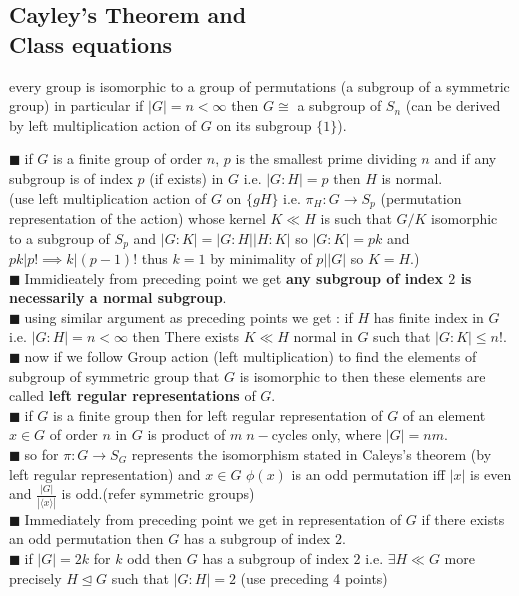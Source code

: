 \documentclass[11pt]{extarticle}
\newcommand{\ra}{\rightarrow}
\newcommand{\snote}[1]{{\footnotesize(#1)}}
\newcommand{\y}{$\blacksquare\;$}
\newcommand{\gen}[1]{\langle #1 \rangle}
\newcommand{\tbx}[2][]{
	\begin{tcolorbox}[enhanced,breakable,size=small,colback=black!2!white,title={#1},arc is angular, arc=1.5mm,drop fuzzy shadow]
		#2
	\end{tcolorbox}
}
\begin{document}
\begin{multicols}{2}
	\subsection{Cayley's Theorem and \\ Class equations}
	\tbx[\textbf{ Cayley's Theorem} ]{every group is isomorphic to a group of permutations (a subgroup
		of a symmetric group)  in particular if $ |G|=n<\infty $  then $ G\cong $ a subgroup of $ S_n $
		\snote{can be derived by left multiplication action of $ G $ on its subgroup $ \{1\} $}.
	}
	\tbx[Consequences of Cayley's theorem]{ 
			\y    if   $ G $ is a finite group of order $ n $, $ p $ is the smallest prime dividing $ n $ and if any subgroup is of 	index $ p $ (if exists) in $ G $ i.e. $ |G:H|=p $ then $ H $ is normal. \\
			\snote{use  left multiplication action of $ G $ on $ \{gH\} $ i.e. $ \pi_H : G\ra S_p $ (permutation representation of the action) whose kernel $ K\ll H $ is such that $ G/K $ isomorphic to a subgroup of $ S_p $ and $|G:K|=|G:H||H:K|  $ so $ |G:K|=pk $ and $ pk|p!\implies k|(p-1)! $ thus $ k=1 $ by minimality of $ p||G| $ so $ K=H $.}\\
			\y Immidieately from preceding point we get \textbf{any subgroup of index $ 2 $ is necessarily a normal subgroup}. \\
			\y  using similar argument as preceding points we get : if $ H $ has finite index in $ G $ i.e. $ |G:H|=n<\infty $ then  
			There exists $ K\ll H $ normal in $ G $ such that $ |G:K|\leq n! .$\\
			\y now if we follow Group action (left multiplication) to find the elements of subgroup of symmetric group that $ G $ is isomorphic to then these elements are called \textbf{left regular representations} of $ G $. \\
			\y  if $ G $ is a finite group then for left regular representation of $ G $ of an element $ x\in G $ of order $ n $ in $ G $ is product of $ m \; n- $cycles only, where $ |G|=nm .$  \\
			\y so for $ \pi:G\ra S_G$ represents the isomorphism stated in Caleys's theorem (by left regular representation)  and  $ x\in G $ $ \phi(x) $ is an odd permutation iff $ |x| $ is even and $ \frac{ |G| }{|\gen{x}|}  $ is odd.\snote{refer symmetric groups}\\
			\y Immediately  from preceding point we get in representation of $ G $ if there exists an odd permutation then $ G $ has a subgroup of index $ 2.$ \\
			\y  if $|G|=2k $ for $ k $ odd then $ G $ has a subgroup of index $ 2 $ i.e. $ \exists H\ll G $ more precisely $ H\trianglelefteq G $ such that $ |G:H|=2 $ ({\footnotesize use preceding 4 points)} 
	}
	

\end{multicols}
\end{document}
